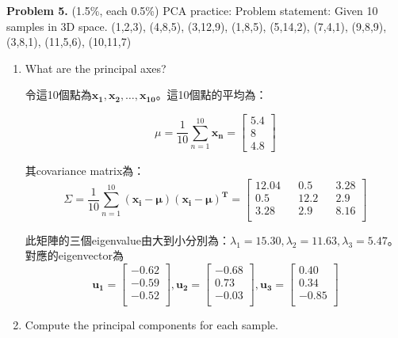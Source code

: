 \documentclass{article}
\begin{document}
\textbf{Problem 5.} (1.5\%, each 0.5\%) ​PCA practice: Problem statement: Given 10 samples in 3D space. (1,2,3), (4,8,5), (3,12,9), (1,8,5), (5,14,2), (7,4,1), (9,8,9), (3,8,1), (11,5,6), (10,11,7)
\begin{enumerate}[label=(\alph*)]
\item What are the principal axes?

令這10個點為$\mathbf{x_1}, \mathbf{x_2}, \ldots, \mathbf{x_10}$。這10個點的平均為：

\begin{equation}
\mu = \frac{1}{10}\sum_{n=1}^{10}\mathbf{x_n} = 
\begin{bmatrix}
5.4\\
8\\
4.8
\end{bmatrix}
\end{equation}

其covariance matrix為：
\begin{equation}
\Sigma = \frac{1}{10}\sum_{n=1}^{10} (\mathbf{x_i}-\mathbf{\mu})(\mathbf{x_i}-\mathbf{\mu})^{\mathbf{T}}=
\begin{bmatrix}
12.04 && 0.5 && 3.28\\
0.5 && 12.2 && 2.9\\
3.28 && 2.9 && 8.16\\
\end{bmatrix}
\end{equation}

此矩陣的三個eigenvalue由大到小分別為：$\lambda_1 = 15.30, \lambda_2 = 11.63, \lambda_3 = 5.47$。對應的eigenvector為
\begin{equation}
\mathbf{u_1} = \begin{bmatrix}
-0.62\\
-0.59\\
-0.52\\
\end{bmatrix}, 
\mathbf{u_2} = \begin{bmatrix}
-0.68\\
0.73\\
-0.03\\
\end{bmatrix}, 
\mathbf{u_3} = \begin{bmatrix}
0.40\\
0.34\\
-0.85\\
\end{bmatrix}
\end{equation}

\item Compute the principal components for each sample.


\end{enumerate}
\end{document}
